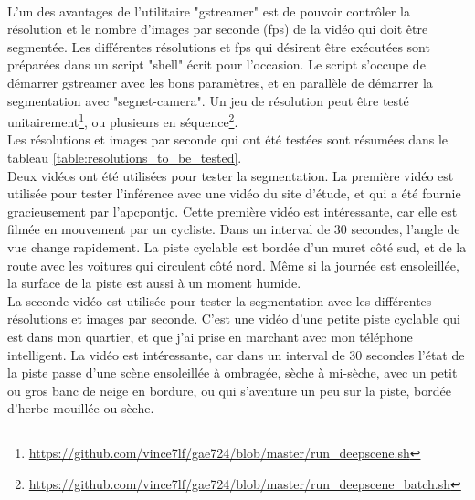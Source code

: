 \vspace{0.5\baselineskip}
\\
\noindent L'un des avantages de l'utilitaire "gstreamer" est de pouvoir contrôler la résolution et le nombre d'images par seconde (\acrshort{fps}) de la vidéo qui doit être segmentée. Les différentes résolutions et \acrshort{fps} qui désirent être exécutées sont préparées dans un script "shell" écrit pour l'occasion. Le script s'occupe de démarrer gstreamer avec les bons paramètres, et en parallèle de démarrer la segmentation avec "segnet-camera". Un jeu de résolution peut être testé unitairement\footnote{\url{https://github.com/vince7lf/gae724/blob/master/run_deepscene.sh}}, ou plusieurs en séquence\footnote{\url{https://github.com/vince7lf/gae724/blob/master/run_deepscene_batch.sh}}. 
\vspace{0.5\baselineskip}
\\
\noindent Les résolutions et images par seconde qui ont été testées sont résumées dans le tableau \ref{table:resolutions_to_be_tested}. 
\vspace{0.5\baselineskip}
\\
\noindent Deux vidéos ont été utilisées pour tester la segmentation. La première vidéo est utilisée pour tester l'inférence avec une vidéo du site d'étude, et qui a été fournie gracieusement par l'\acrshort{apcpontjc}. Cette première vidéo est intéressante, car elle est filmée en mouvement par un cycliste. Dans un interval de 30 secondes, l'angle de vue change rapidement. La piste cyclable est bordée d'un muret côté sud, et de la route avec les voitures qui circulent côté nord. Même si la journée est ensoleillée, la surface de la piste est aussi à un moment humide.
\vspace{0.5\baselineskip}
\\
\noindent La seconde vidéo est utilisée pour tester la segmentation avec les différentes résolutions et images par seconde. C'est une vidéo d'une petite piste cyclable qui est dans mon quartier, et que j'ai prise en marchant avec mon téléphone intelligent. La vidéo est intéressante, car dans un interval de 30 secondes l'état de la piste passe d'une scène ensoleillée à ombragée, sèche à mi-sèche, avec un petit ou gros banc de neige en bordure, ou qui s'aventure un peu sur la piste, bordée d'herbe mouillée ou sèche.